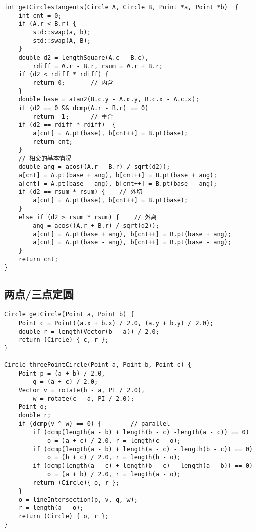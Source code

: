 \begin{verbatim}
int getCirclesTangents(Circle A, Circle B, Point *a, Point *b)  {
    int cnt = 0;
    if (A.r < B.r) {
        std::swap(a, b);
        std::swap(A, B);
    }
    double d2 = lengthSquare(A.c - B.c),
        rdiff = A.r - B.r, rsum = A.r + B.r;
    if (d2 < rdiff * rdiff) {
        return 0;       // 内含 
    }
    double base = atan2(B.c.y - A.c.y, B.c.x - A.c.x);
    if (d2 == 0 && dcmp(A.r - B.r) == 0)
        return -1;      // 重合
    if (d2 == rdiff * rdiff)  {
        a[cnt] = A.pt(base), b[cnt++] = B.pt(base);
        return cnt;
    }
    // 相交的基本情况 
    double ang = acos((A.r - B.r) / sqrt(d2));
    a[cnt] = A.pt(base + ang), b[cnt++] = B.pt(base + ang);
    a[cnt] = A.pt(base - ang), b[cnt++] = B.pt(base - ang);
    if (d2 == rsum * rsum) {    // 外切 
        a[cnt] = A.pt(base), b[cnt++] = B.pt(base);
    }
    else if (d2 > rsum * rsum) {    // 外离 
        ang = acos((A.r + B.r) / sqrt(d2));
        a[cnt] = A.pt(base + ang), b[cnt++] = B.pt(base + ang);
        a[cnt] = A.pt(base - ang), b[cnt++] = B.pt(base - ang);
    }
    return cnt;
}
\end{verbatim}

\subsection{两点/三点定圆}
\begin{verbatim}
Circle getCircle(Point a, Point b) {
    Point c = Point((a.x + b.x) / 2.0, (a.y + b.y) / 2.0);
    double r = length(Vector(b - a)) / 2.0;
    return (Circle) { c, r };
}

Circle threePointCircle(Point a, Point b, Point c) {
    Point p = (a + b) / 2.0,
        q = (a + c) / 2.0;
    Vector v = rotate(b - a, PI / 2.0),
        w = rotate(c - a, PI / 2.0);
    Point o;
    double r;
    if (dcmp(v ^ w) == 0) {        // parallel
        if (dcmp(length(a - b) + length(b - c) -length(a - c)) == 0)
            o = (a + c) / 2.0, r = length(c - o);
        if (dcmp(length(a - b) + length(a - c) - length(b - c)) == 0)
            o = (b + c) / 2.0, r = length(b - o);
        if (dcmp(length(a - c) + length(b - c) - length(a - b)) == 0)
            o = (a + b) / 2.0, r = length(a - o);
        return (Circle){ o, r };
    }
    o = lineIntersection(p, v, q, w);
    r = length(a - o);
    return (Circle) { o, r };
}
\end{verbatim}

